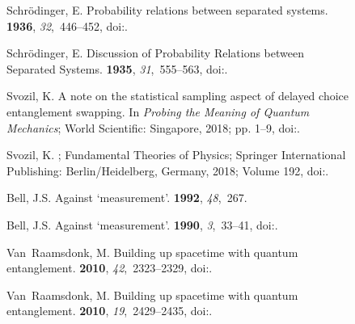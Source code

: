 \documentclass[entropy,article,accept,oneauthor,pdftex]{Definitions/mdpi}
\begin{document}
\begin{figure}[H]
\begin{thebibliography}{999}
Schr{\"{o}}dinger, E.
\newblock Probability relations between separated systems.
 {\bf 1936}, {\em 32},~446--452, doi:{\href{https://doi.org/10.1017/S0305004100019137}{}}.

Schr{\"{o}}dinger, E.
\newblock Discussion of Probability Relations between Separated Systems.
 {\bf 1935}, {\em 31},~555--563, doi:{\href{https://doi.org/10.1017/S0305004100013554}{}}.

Svozil, K.
\newblock A note on the statistical sampling aspect of delayed choice
  entanglement swapping. In {\em Probing the Meaning of Quantum Mechanics};
  World Scientific: Singapore, 2018; pp. 1--9, doi:{\href{https://doi.org/10.1142/9789813276895\_0001}{}}.

Svozil, K.
; Fundamental Theories of Physics; Springer International Publishing: Berlin/Heidelberg, Germany, 2018; Volume 192, doi:{\href{https://doi.org/10.1007/978-3-319-70815-7}{}}.

Bell, J.S.
\newblock Against `measurement'.
 {\bf 1992}, {\em 48},~267.

Bell, J.S.
\newblock Against `measurement'.
 {\bf 1990}, {\em 3},~33--41, doi:{\href{https://doi.org/10.1088/2058-7058/3/8/26}{}}.

Van~Raamsdonk, M.%
\newblock Building up spacetime with quantum entanglement.
 {\bf 2010}, {\em 42},~2323--2329, doi:{\href{https://doi.org/10.1007/s10714-010-1034-0}{}}.

Van~Raamsdonk, M.
\newblock Building up spacetime with quantum entanglement.
 {\bf 2010}, {\em
  19},~2429--2435,  doi:{\href{https://doi.org/10.1142/s0218271810018529}{}}.


\end{thebibliography}
\end{figure}
\end{document}

